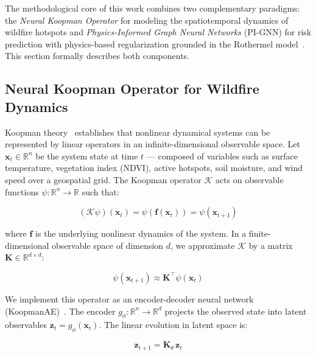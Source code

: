 \documentclass[preprint,12pt,times,numbers]{elsarticle}
\begin{document}
The methodological core of this work combines two complementary paradigms: the \emph{Neural Koopman Operator} for modeling the spatiotemporal dynamics of wildfire hotspots and \emph{Physics-Informed Graph Neural Networks} (PI-GNN) for risk prediction with physics-based regularization grounded in the Rothermel model~\cite{article:rothermel1972}. This section formally describes both components.

\subsection{Neural Koopman Operator for Wildfire Dynamics}
\label{sec:koopman}

Koopman theory~\cite{article:koopman1931,article:rowley2009,article:mezic2013} establishes that nonlinear dynamical systems can be represented by linear operators in an infinite-dimensional observable space. Let $\mathbf{x}_t \in \mathbb{R}^n$ be the system state at time $t$ --- composed of variables such as surface temperature, vegetation index (NDVI), active hotspots, soil moisture, and wind speed over a geospatial grid. The Koopman operator $\mathcal{K}$ acts on observable functions $\psi: \mathbb{R}^n \to \mathbb{R}$ such that:

\begin{equation}
(\mathcal{K} \psi)(\mathbf{x}_t) = \psi(\mathbf{f}(\mathbf{x}_t)) = \psi(\mathbf{x}_{t+1})
\label{eq:koopman_def}
\end{equation}

where $\mathbf{f}$ is the underlying nonlinear dynamics of the system. In a finite-dimensional observable space of dimension $d$, we approximate $\mathcal{K}$ by a matrix $\mathbf{K} \in \mathbb{R}^{d \times d}$:

\begin{equation}
\psi(\mathbf{x}_{t+1}) \approx \mathbf{K}^\top \psi(\mathbf{x}_t)
\label{eq:koopman_lin}
\end{equation}

We implement this operator as an encoder-decoder neural network (KoopmanAE)~\cite{article:lusch2018,article:takeishi2017}. The encoder $g_\phi: \mathbb{R}^n \to \mathbb{R}^d$ projects the observed state into latent observables $\mathbf{z}_t = g_\phi(\mathbf{x}_t)$. The linear evolution in latent space is:

\begin{equation}
\mathbf{z}_{t+1} = \mathbf{K}_\theta \, \mathbf{z}_t
\label{eq:latent_evolution}
\end{equation}
\end{document}
